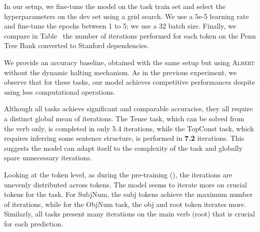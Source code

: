 In our setup, we fine-tune the model on the task train set and select the hyperparameters on the dev set using a grid search. We use a 5e-5 learning rate and fine-tune the epochs between 1 to 5; we use a 32 batch size.
Finally, we %
compare in Table~ the number of iterations performed for each token 
on the Penn Tree Bank \parencite{marcus_94} converted to Stanford dependencies.

We provide an accuracy baseline, obtained with the same setup but using \textsc{Albert}  without the dynamic halting mechanism. As in the previous experiment, we observe that for these tasks, our model achieves competitive performances despite using less computational operations.

Although all tasks achieve significant and comparable accuracies, they all require a distinct global mean of iterations. The Tense task, which can be solved from the verb only, is completed in only 5.4 iterations, while the TopConst task, which requires inferring some sentence structure, is performed in \textbf{7.2} iterations. This suggests the model can adapt itself to the complexity of the task and globally spare unnecessary iterations. 

Looking at the token level, as during the pre-training (), the iterations are unevenly distributed across tokens. The model seems to iterate more on crucial tokens for the task. For SubjNum, the subj tokens achieve the maximum number of iterations, while for the ObjNum task, the obj and root token iterates more. Similarly, all tasks present many iterations on the main verb (root) that is crucial for each prediction.

